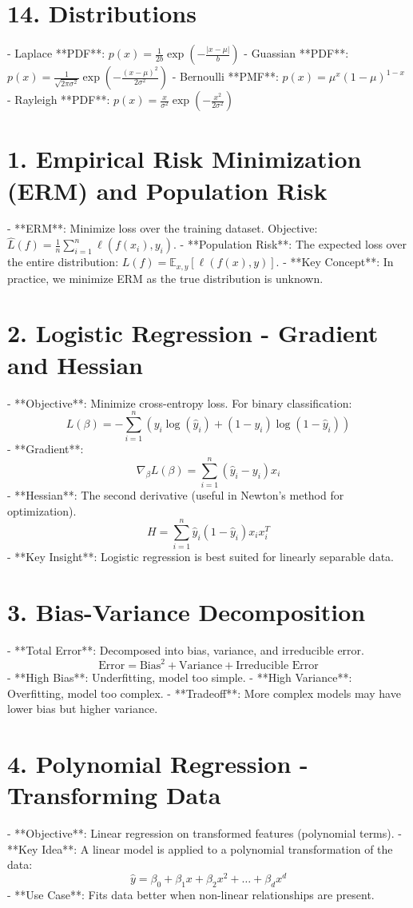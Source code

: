 \documentclass[10pt]{article}
\begin{document}
\begin{multicols}{2}
\section*{14. Distributions}

- Laplace **PDF**: $p(x) = \frac{1}{2b} \exp\left(-\frac{|x-\mu|}{b}\right)$
- Guassian **PDF**: $p(x) = \frac{1}{\sqrt{2\pi\sigma^2}} \exp\left(-\frac{(x-\mu)^2}{2\sigma^2}\right)$
- Bernoulli **PMF**: $p(x) = \mu^x(1-\mu)^{1-x}$
- Rayleigh **PDF**: $p(x) = \frac{x}{\sigma^2} \exp\left(-\frac{x^2}{2\sigma^2}\right)$




\section*{1. Empirical Risk Minimization (ERM) and Population Risk}
- **ERM**: Minimize loss over the training dataset. Objective: $\hat{L}(f) = \frac{1}{n} \sum_{i=1}^{n} \ell(f(x_i), y_i)$.
- **Population Risk**: The expected loss over the entire distribution: $L(f) = \mathbb{E}_{x,y}[\ell(f(x), y)]$.
- **Key Concept**: In practice, we minimize ERM as the true distribution is unknown.

\section*{2. Logistic Regression - Gradient and Hessian}
- **Objective**: Minimize cross-entropy loss. For binary classification:
  \[
  L(\beta) = - \sum_{i=1}^{n} \left( y_i \log(\hat{y}_i) + (1 - y_i) \log(1 - \hat{y}_i) \right)
  \]
- **Gradient**: 
  \[
  \nabla_{\beta} L(\beta) = \sum_{i=1}^{n} \left( \hat{y}_i - y_i \right) x_i
  \]
- **Hessian**: The second derivative (useful in Newton’s method for optimization).
  \[
  H = \sum_{i=1}^{n} \hat{y}_i (1 - \hat{y}_i) x_i x_i^T
  \]
- **Key Insight**: Logistic regression is best suited for linearly separable data.

\section*{3. Bias-Variance Decomposition}
- **Total Error**: Decomposed into bias, variance, and irreducible error.
  \[
  \text{Error} = \text{Bias}^2 + \text{Variance} + \text{Irreducible Error}
  \]
- **High Bias**: Underfitting, model too simple.
- **High Variance**: Overfitting, model too complex.
- **Tradeoff**: More complex models may have lower bias but higher variance.

\section*{4. Polynomial Regression - Transforming Data}
- **Objective**: Linear regression on transformed features (polynomial terms).
- **Key Idea**: A linear model is applied to a polynomial transformation of the data:
  \[
  \hat{y} = \beta_0 + \beta_1 x + \beta_2 x^2 + \dots + \beta_d x^d
  \]
- **Use Case**: Fits data better when non-linear relationships are present.


\end{multicols}
\end{document}
